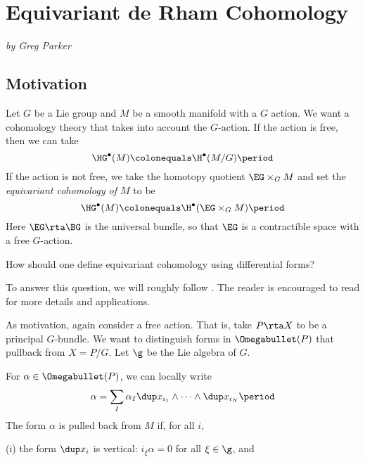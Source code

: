 
\section{Equivariant de Rham Cohomology}\label{EquivariantdeRhamCohomology}
\textit{by Greg Parker}


\subsection{Motivation}
Let $G$ be a Lie group and $M$ be a smooth manifold with a $G$ action. We want a cohomology theory that takes into account the $G$-action. If the action is free, then we can take
\[\HG^\bullet(M)\colonequals \H^\bullet(M/G)\period\]
If the action is not free, we take the homotopy quotient $\EG\times_G M$ and set the \emph{equivariant cohomology of $M$} to be 
\[\HG^\bullet(M)\colonequals \H^\bullet(\EG\times_G M)\period\]
Here $\EG\rta \BG$ is the universal bundle, so that $\EG$ is a contractible space with a free $G$-action. 
\begin{quest}
How should one define equivariant cohomology using differential forms?
\end{quest}

\noindent To answer this question, we will roughly follow \cite[Chapter 1-4]{MR1689252}. 
The reader is encouraged to read \cite{MR1689252} for more details and applications. 

As motivation, again consider a free action. That is, take $P\rta X$ to be a principal $G$-bundle. 
We want to distinguish forms in $\Omegabullet(P)$ that pullback from $X=P/G$. 
Let $\g $ be the Lie algebra of $G$. 

For $\alpha\in\Omegabullet(P)$, we can locally write
\[\alpha=\sum_I\alpha_I\dup x_{i_1}\wedge\cdots\wedge\dup x_{i_N}\period\]
The form $\alpha$ is pulled back from $M$ if, for all $i$, 

(i) the form $\dup x_i$ is vertical: $i_\xi\alpha=0$ for all $\xi\in\g$, and 

